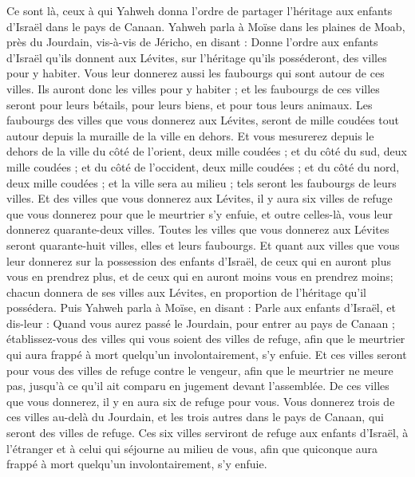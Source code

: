 \begin{multicols}{2}
Ce sont là, ceux à qui Yahweh donna l'ordre de partager l'héritage aux enfants d'Israël dans le pays de Canaan.
\VerseOne{}Yahweh parla à Moïse dans les plaines de Moab, près du Jourdain, vis-à-vis de Jéricho, en disant :
Donne l'ordre aux enfants d'Israël qu'ils donnent aux Lévites, sur l'héritage qu'ils posséderont, des villes pour y habiter. Vous leur donnerez aussi les faubourgs qui sont autour de ces villes.
Ils auront donc les villes pour y habiter ; et les faubourgs de ces villes seront pour leurs bétails, pour leurs biens, et pour tous leurs animaux.
Les faubourgs des villes que vous donnerez aux Lévites, seront de mille coudées tout autour depuis la muraille de la ville en dehors.
Et vous mesurerez depuis le dehors de la ville du côté de l'orient, deux mille coudées ; et du côté du sud, deux mille coudées ; et du côté de l'occident, deux mille coudées ; et du côté du nord, deux mille coudées ; et la ville sera au milieu ; tels seront les faubourgs de leurs villes.
Et des villes que vous donnerez aux Lévites, il y aura six villes de refuge que vous donnerez pour que le meurtrier s'y enfuie, et outre celles-là, vous leur donnerez quarante-deux villes.
Toutes les villes que vous donnerez aux Lévites seront quarante-huit villes, elles et leurs faubourgs.
Et quant aux villes que vous leur donnerez sur la possession des enfants d'Israël, de ceux qui en auront plus vous en prendrez plus, et de ceux qui en auront moins vous en prendrez moins; chacun donnera de ses villes aux Lévites, en proportion de l'héritage qu'il possédera.
Puis Yahweh parla à Moïse, en disant :
Parle aux enfants d'Israël, et dis-leur : Quand vous aurez passé le Jourdain, pour entrer au pays de Canaan ;
établissez-vous des villes qui vous soient des villes de refuge, afin que le meurtrier qui aura frappé à mort quelqu'un involontairement, s'y enfuie.
Et ces villes seront pour vous des villes de refuge contre le vengeur, afin que le meurtrier ne meure pas, jusqu'à ce qu'il ait comparu en jugement devant l'assemblée.
De ces villes que vous donnerez, il y en aura six de refuge pour vous.
Vous donnerez trois de ces villes au-delà du Jourdain, et les trois autres dans le pays de Canaan, qui seront des villes de refuge.
Ces six villes serviront de refuge aux enfants d'Israël, à l'étranger et à celui qui séjourne au milieu de vous, afin que quiconque aura frappé à mort quelqu'un involontairement, s'y enfuie.

\end{multicols}
